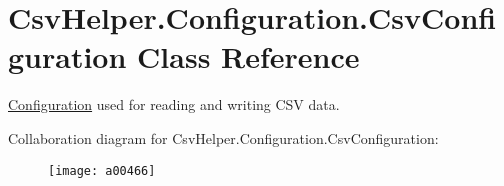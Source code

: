 \hypertarget{a00053}{\section{Csv\-Helper.\-Configuration.\-Csv\-Configuration Class Reference}
\label{a00053}
}


\hyperlink{a00320}{Configuration} used for reading and writing C\-S\-V data.  




Collaboration diagram for Csv\-Helper.\-Configuration.\-Csv\-Configuration\-:
\nopagebreak
\begin{figure}[H]
\begin{center}
\leavevmode
\texttt{[image: a00466]}
\end{center}
\end{figure}
